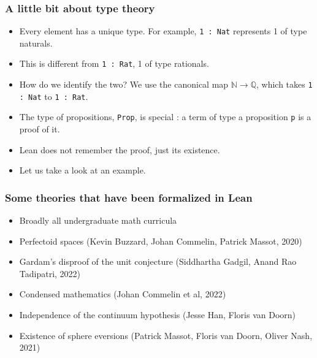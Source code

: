 \documentclass{beamer} %
\begin{document}
\begin{frame}
\frametitle{A little bit about type theory}
\begin{itemize}
\item [\textbullet] Every element has a unique type. For example, \texttt{1 : Nat} represents 1 of type naturals. \pause
\item [\textbullet] This is different from \texttt{1 : Rat}, 1 of type rationals. \pause
\item [\textbullet] How do we identify the two? We use the canonical map $\mathbb{N} \to \mathbb{Q}$, which takes \texttt{1 : Nat} to \texttt{1 : Rat}. \pause
\item [\textbullet] The type of propositions, \texttt{Prop}, is special : a term of type a proposition \texttt{p} is a proof of it. \pause
\item [\textbullet] Lean does not remember the proof, just its existence.
\item [\textbullet] Let us take a look at an example.
\end{itemize}
\end{frame}
\begin{frame}
\frametitle{Some theories that have been formalized in Lean}
\begin{itemize}
\item [\textbullet] Broadly all undergraduate math curricula
\item [\textbullet] Perfectoid spaces (Kevin Buzzard, Johan Commelin, Patrick Massot, 2020)
\item [\textbullet] Gardam's disproof of the unit conjecture (Siddhartha Gadgil, Anand Rao Tadipatri, 2022)
\item [\textbullet] Condensed mathematics (Johan Commelin et al, 2022)
\item [\textbullet] Independence of the continuum hypothesis (Jesse Han, Floris van Doorn)
\item [\textbullet] Existence of sphere eversions (Patrick Massot, Floris van Doorn, Oliver Nash, 2021)
\end{itemize}
\end{frame}
\end{document}
